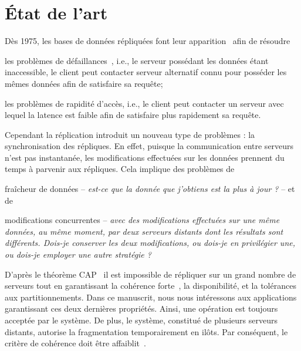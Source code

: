 

\section{État de l'art}
\label{repl:sec:stateoftheart}

Dès 1975, les bases de données répliquées font leur
apparition~\cite{johnson1975maintenance} afin de résoudre
\begin{inparaenum}[(i)]
\item les problèmes de défaillances~\cite{alsberg1976principle}, i.e., le
  serveur possédant les données étant inaccessible, le client peut contacter
  serveur alternatif connu pour posséder les mêmes données afin de satisfaire sa
  requête;
\item les problèmes de rapidité d'accès, i.e., le client peut contacter un
  serveur avec lequel la latence est faible afin de satisfaire plus rapidement
  sa requête.
\end{inparaenum}

Cependant la réplication introduit un nouveau type de problèmes : la
synchronisation des répliques. En effet, puisque la communication entre serveurs
n'est pas instantanée, les modifications effectuées sur les données prennent du
temps à parvenir aux répliques. Cela implique des problèmes de
\begin{inparaenum}[(i)]
\item fraîcheur de données -- \emph{est-ce que la donnée que j'obtiens est la
    plus à jour ?} -- et de
\item modifications concurrentes -- \emph{avec des modifications effectuées sur
    une même données, au même moment, par deux serveurs distants dont les
    résultats sont différents. Dois-je conserver les deux modifications, ou
    dois-je en privilégier une, ou dois-je employer une autre stratégie ?}
\end{inparaenum}


D'après le théorème CAP~\cite{brewer2012cap, gilbert2002brewer} il est
impossible de répliquer sur un grand nombre de serveurs tout en garantissant la
cohérence forte~\cite{herlihy1990linearizability}, la disponibilité, et la
tolérances aux partitionnements. Dans ce manuscrit, nous nous intéressons aux
applications garantissant ces deux dernières propriétés. Ainsi, une opération
est toujours acceptée par le système. De plus, le système, constitué de
plusieurs serveurs distants, autorise la fragmentation temporairement en
ilôts. Par conséquent, le critère de cohérence doit être
affaiblit~\cite{bailis2013eventual, shapiro2011conflict}.

